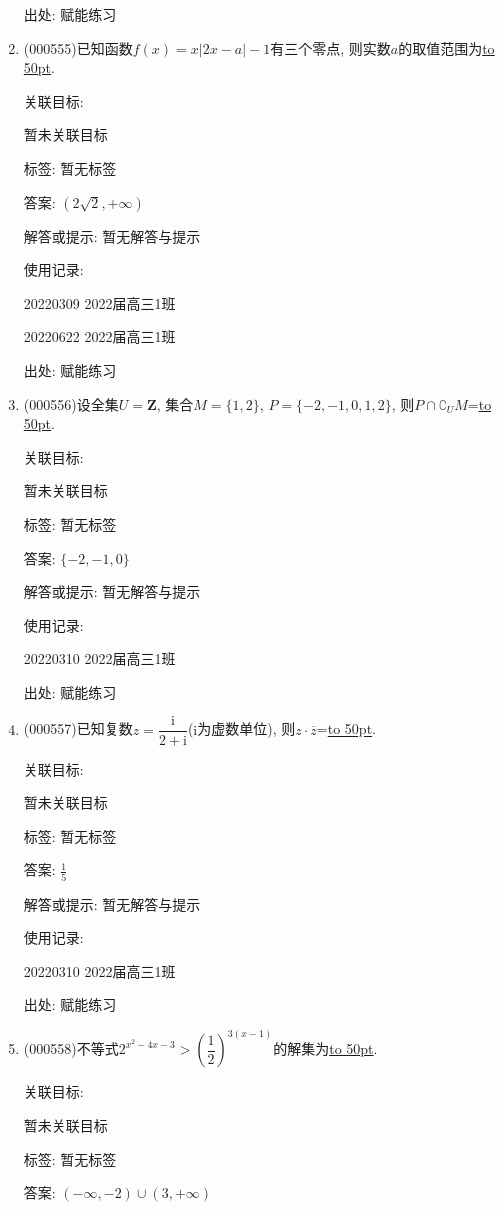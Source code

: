 \documentclass[10pt,a4paper]{article}
\newcommand{\blank}[1]{\underline{\hbox to #1pt{}}}
\begin{document}
\begin{enumerate}[1.]
出处: 赋能练习
\item { (000555)}已知函数$f(x)=x|2x-a|-1$有三个零点, 则实数$a$的取值范围为\blank{50}.


关联目标:

暂未关联目标



标签: 暂无标签

答案: $(2\sqrt 2,+\infty)$

解答或提示: 暂无解答与提示

使用记录:

20220309	2022届高三1班	

20220622	2022届高三1班  	


出处: 赋能练习
\item { (000556)}设全集$U=\mathbf{Z}$, 集合$M=\{1,2\}$, $P=\{-2,-1,0,1,2\}$, 则$P\cap \complement_U M$=\blank{50}.


关联目标:

暂未关联目标



标签: 暂无标签

答案: $\{-2,-1,0\}$

解答或提示: 暂无解答与提示

使用记录:

20220310	2022届高三1班	


出处: 赋能练习
\item { (000557)}已知复数$z=\dfrac{\mathrm{i}}{2+\mathrm{i}}$($\mathrm{i}$为虚数单位), 则$z\cdot \overline z$=\blank{50}.


关联目标:

暂未关联目标



标签: 暂无标签

答案: $\frac 15$

解答或提示: 暂无解答与提示

使用记录:

20220310	2022届高三1班	


出处: 赋能练习
\item { (000558)}不等式$2^{x^2-4x-3}>(\dfrac12 )^{3(x-1)}$的解集为\blank{50}.


关联目标:

暂未关联目标



标签: 暂无标签

答案: $(-\infty ,-2)\cup (3,+\infty)$


\end{enumerate}
\end{document}
